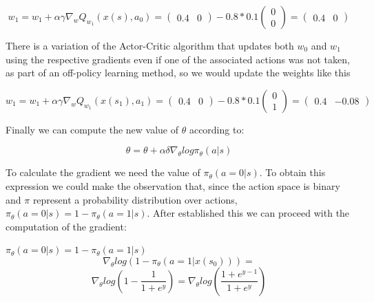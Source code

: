 \documentclass[10pt,a4paper]{article}
\begin{document}
\begin{equation*}
    w_1 = w_1 + \alpha\gamma \nabla_w Q_{w_1} (x(s), a_0) = \begin{pmatrix} 0.4 & 0 \end{pmatrix} -0.8 * 0.1 \begin{pmatrix} 0 \\ 0 \end{pmatrix} = \begin{pmatrix} 0.4 & 0 \end{pmatrix}
\end{equation*}

There is a variation of the Actor-Critic algorithm that updates both $w_0$ and $w_1$ using the respective gradients even if one of the associated actions was not taken, as part of an off-policy learning method, so we would update the weights like this

\begin{equation*}
    w_1 = w_1 + \alpha\gamma \nabla_w Q_{w_1} (x(s_1), a_1) = \begin{pmatrix} 0.4 & 0 \end{pmatrix} -0.8 * 0.1 \begin{pmatrix} 0 \\ 1 \end{pmatrix} = \begin{pmatrix} 0.4 & -0.08 \end{pmatrix}
\end{equation*}

Finally we can compute the new value of $\theta$ according to:

\begin{equation*}
    \theta = \theta + \alpha\delta\nabla_\theta log \pi_\theta (a|s)
\end{equation*}

To calculate the gradient we need the value of $ \pi_\theta (a = 0|s) $. To obtain this expression we could make the observation that, since
the action space is binary and $\pi$ represent a probability distribution over actions,
$\pi_\theta (a = 0|s) = 1 - \pi_\theta (a = 1|s)$. After established this we can proceed with the
computation of the gradient:

$\pi_\theta (a = 0|s) = 1 - \pi_\theta (a = 1|s)$
\begin{equation*}
    \nabla_\theta log(1 - \pi_\theta (a = 1|x(s_0))) =
\end{equation*}
\begin{equation*}
    \nabla_\theta log ( 1 - \frac{1}{1 + e^y} ) = \nabla_\theta log ( \frac{1 + e^{y - 1}}{1 + e^y} ) 
\end{equation*}
\end{document}
